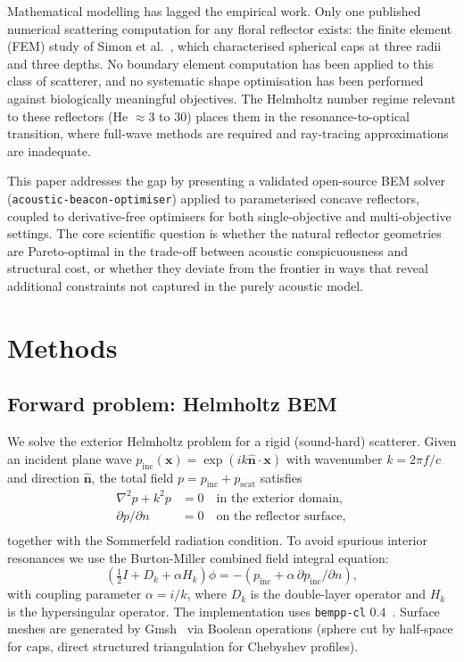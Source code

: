 \documentclass[preprint,12pt]{elsarticle}
\begin{document}
Mathematical modelling has lagged the empirical work. Only one published numerical scattering computation for any floral reflector exists: the finite element (FEM) study of Simon et al.~\cite{Simon2020}, which characterised spherical caps at three radii and three depths. No boundary element computation has been applied to this class of scatterer, and no systematic shape optimisation has been performed against biologically meaningful objectives. The Helmholtz number regime relevant to these reflectors (He $\approx 3$ to $30$) places them in the resonance-to-optical transition, where full-wave methods are required and ray-tracing approximations are inadequate.

This paper addresses the gap by presenting a validated open-source BEM solver (\texttt{acoustic-beacon-optimiser}) applied to parameterised concave reflectors, coupled to derivative-free optimisers for both single-objective and multi-objective settings. The core scientific question is whether the natural reflector geometries are Pareto-optimal in the trade-off between acoustic conspicuousness and structural cost, or whether they deviate from the frontier in ways that reveal additional constraints not captured in the purely acoustic model.

\section{Methods}
\label{sec:methods}

\subsection{Forward problem: Helmholtz BEM}
\label{sec:bem}

We solve the exterior Helmholtz problem for a rigid (sound-hard) scatterer. Given an incident plane wave $p_{\mathrm{inc}}(\mathbf{x}) = \exp(i k \hat{\mathbf{n}} \cdot \mathbf{x})$ with wavenumber $k = 2\pi f / c$ and direction $\hat{\mathbf{n}}$, the total field $p = p_{\mathrm{inc}} + p_{\mathrm{scat}}$ satisfies
\begin{align}
\nabla^2 p + k^2 p &= 0 \quad \text{in the exterior domain}, \\
\partial p / \partial n &= 0 \quad \text{on the reflector surface}, \\
\end{align}
together with the Sommerfeld radiation condition. To avoid spurious interior resonances we use the Burton-Miller combined field integral equation:
\begin{equation}
\left( \tfrac{1}{2} I + D_k + \alpha H_k \right) \phi = - \left( p_{\mathrm{inc}} + \alpha \, \partial p_{\mathrm{inc}} / \partial n \right),
\end{equation}
with coupling parameter $\alpha = i/k$, where $D_k$ is the double-layer operator and $H_k$ is the hypersingular operator. The implementation uses \texttt{bempp-cl} 0.4~\cite{bempp}. Surface meshes are generated by Gmsh~\cite{gmsh} via Boolean operations (sphere cut by half-space for caps, direct structured triangulation for Chebyshev profiles).
\end{document}
